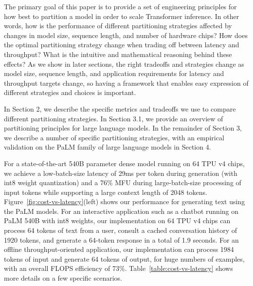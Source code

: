 The primary goal of this paper is to provide a set of engineering principles for how best to partition a model in order to scale Transformer inference. In other words, how is the performance of different partitioning strategies affected by changes in model size, sequence length, and number of hardware chips? How does the optimal partitioning strategy change when trading off between latency and throughput? What is the intuitive and mathematical reasoning behind these effects? As we show in later sections, the right tradeoffs and strategies change as model size, sequence length, and application requirements for latency and throughput targets change, so having a framework that enables easy expression of different strategies and choices is important.

In Section 2, we describe the specific metrics and tradeoffs we use to compare different partitioning strategies. In Section 3.1, we provide an overview of partitioning principles for large language models. In the remainder of Section 3, we describe a number of specific partitioning strategies, with an empirical validation on the PaLM family of large language models in Section 4. 

For a state-of-the-art 540B parameter dense model running on 64 TPU v4 chips, we achieve a low-batch-size latency of 29ms per token during generation (with int8 weight quantization) and a 76\% MFU during large-batch-size processing of input tokens while supporting a large context length of 2048 tokens. 
Figure~\ref{fig:cost-vs-latency}(left) shows our performance for generating text using the PaLM models. For an interactive application such as a chatbot running on PaLM 540B with int8 weights, our implementation on 64 TPU v4 chips can process 64 tokens of text from a user, consult a cached conversation history of 1920 tokens, and generate a 64-token response in a total of 1.9 seconds. For an offline throughput-oriented application, our implementation can process 1984 tokens of input and generate 64 tokens of output, for huge numbers of examples, with an overall FLOPS efficiency of 73\%. Table~\ref{table:cost-vs-latency} shows more details on a few specific scenarios.

